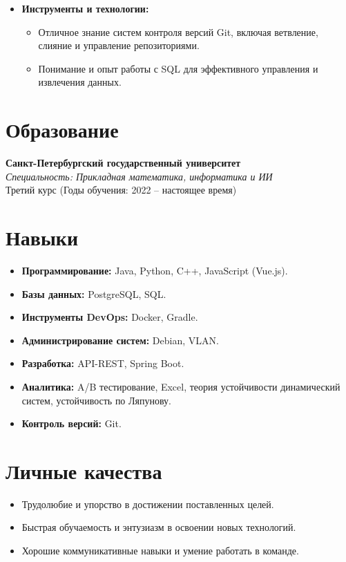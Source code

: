 \documentclass[a4paper,10pt]{article}
\begin{document}
\begin{itemize}
    \item \textbf{Инструменты и технологии:}
    \begin{itemize}
        \item Отличное знание систем контроля версий Git, включая ветвление, слияние и управление репозиториями.
        \item Понимание и опыт работы с SQL для эффективного управления и извлечения данных.
    \end{itemize}
\end{itemize}

\vspace{0.5cm}

\section*{Образование}

\textbf{Санкт-Петербургский государственный университет} \\
\textit{Специальность: Прикладная математика, информатика и ИИ} \\
Третий курс (Годы обучения: 2022 – настоящее время)

\vspace{0.5cm}

\section*{Навыки}

\begin{itemize}
    \item \textbf{Программирование:} Java, Python, C++, JavaScript (Vue.js).
    \item \textbf{Базы данных:} PostgreSQL, SQL.
    \item \textbf{Инструменты DevOps:} Docker, Gradle.
    \item \textbf{Администрирование систем:} Debian, VLAN.
    \item \textbf{Разработка:} API-REST, Spring Boot.
    \item \textbf{Аналитика:} A/B тестирование, Excel, теория устойчивости динамический систем, устойчивость по Ляпунову.
    \item \textbf{Контроль версий:} Git.
\end{itemize}

\vspace{0.5cm}

\section*{Личные качества}

\begin{itemize}
    \item Трудолюбие и упорство в достижении поставленных целей.
    \item Быстрая обучаемость и энтузиазм в освоении новых технологий.
    \item Хорошие коммуникативные навыки и умение работать в команде.
\end{itemize}
\end{document}
